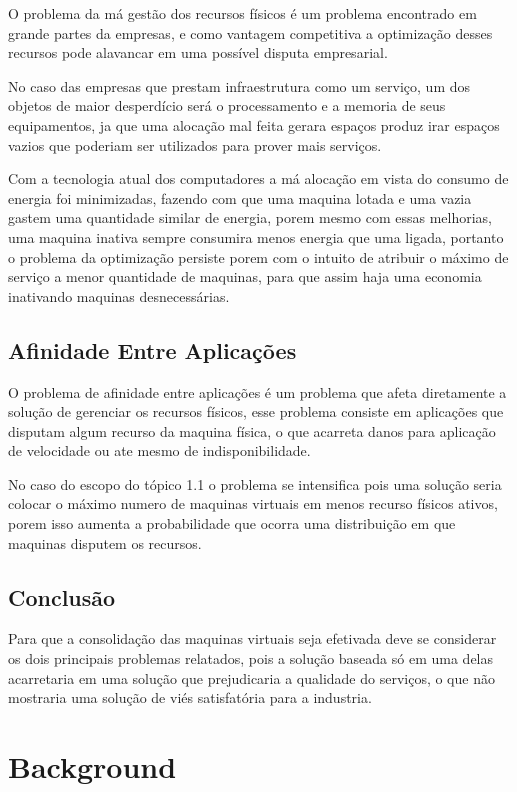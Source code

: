 O problema da má gestão dos recursos físicos é um problema encontrado em grande partes da empresas, e como vantagem competitiva a optimização desses recursos pode alavancar em uma possível disputa empresarial.

No caso das empresas que prestam infraestrutura como um serviço, um dos objetos de maior desperdício será o processamento e a memoria de seus equipamentos, ja que uma alocação mal feita gerara espaços produz irar espaços vazios que poderiam ser utilizados para prover mais serviços.

Com a tecnologia atual dos computadores a má alocação em vista do consumo de energia foi minimizadas, fazendo com que uma maquina lotada e uma vazia gastem uma quantidade similar de energia, porem mesmo com essas melhorias, uma maquina inativa sempre consumira menos energia que uma ligada, portanto o problema da optimização persiste porem com o intuito de atribuir o máximo de serviço a menor quantidade de maquinas, para que assim haja uma economia inativando maquinas desnecessárias.

\section{Afinidade Entre Aplicações}

O problema de afinidade entre aplicações é um problema que afeta diretamente a solução de gerenciar os recursos físicos, esse problema consiste em aplicações que disputam algum recurso da maquina física, o que acarreta danos para aplicação de velocidade ou ate mesmo de indisponibilidade.

No caso do escopo do tópico 1.1 o problema se intensifica pois uma solução seria colocar o máximo numero de maquinas virtuais em menos recurso físicos ativos, porem isso aumenta a probabilidade que ocorra uma distribuição em que maquinas disputem os recursos.

\section{Conclusão}

Para que a consolidação das maquinas virtuais seja efetivada deve se considerar os dois principais problemas relatados, pois a solução baseada só em uma delas acarretaria em uma solução que prejudicaria a qualidade do serviços, o que não mostraria uma solução de viés satisfatória para a industria.
 
\chapter{Background}

